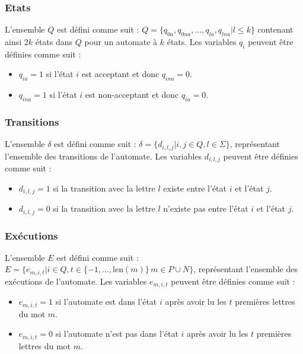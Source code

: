 \documentclass[a4paper, 12pt]{extarticle}
\begin{document}
\subsubsection{Etats}
\label{sec:etats}

\noindent L'ensemble $Q$ est défini comme suit : $Q = \{q_{0a}, q_{0na}, \dots, q_{la}, q_{lna} | l \le k\}$ contenant
ainsi $2k$ états dans $Q$ pour un automate à $k$ états. Les variables $q_i$ peuvent être définies comme suit : 
\begin{itemize}[label=$\bullet$]
    \item $q_{ia} = 1$ si l'état $i$ est acceptant et donc $q_{ina} = 0$.
    \item $q_{ina} = 1$ si l'état $i$ est non-acceptant et donc $q_{ia} = 0$.
\end{itemize}

\subsubsection{Transitions} 
\label{sec:transitions} 

\noindent L'ensemble $\delta$ est défini comme suit : $\delta = \{d_{i, l, j} | i, j \in Q, l \in \Sigma\}$, représentant
l'ensemble des transitions de l'automate. Les variables $d_{i, l, j}$ peuvent être définies comme suit : 
\begin{itemize}[label=$\bullet$]
    \item $d_{i, l, j} = 1$ si la transition avec la lettre $l$ existe entre l'état $i$ et l'état $j$.
    \item $d_{i, l, j} = 0$ si la transition avec la lettre $l$ n'existe pas entre l'état $i$ et l'état $j$.
\end{itemize} 


\subsubsection{Exécutions}
\label{sec:executions}

\noindent L'ensemble $E$ est défini comme suit : $E = \{e_{m, i, t} | i \in Q, t \in \{-1,\dots,\text{len}(m)\}\, m \in P \cup N\}$,
représentant l'ensemble des exécutions de l'automate. Les variables $e_{m, i, t}$ peuvent être définies comme suit :
\begin{itemize}[label=$\bullet$]
    \item $e_{m, i, t} = 1$ si l'automate est dans l'état $i$ après avoir lu les $t$ premières lettres du mot $m$.
    \item $e_{m, i, t} = 0$ si l'automate n'est pas dans l'état $i$ après avoir lu les $t$ premières lettres du mot $m$.
\end{itemize}
\end{document}
